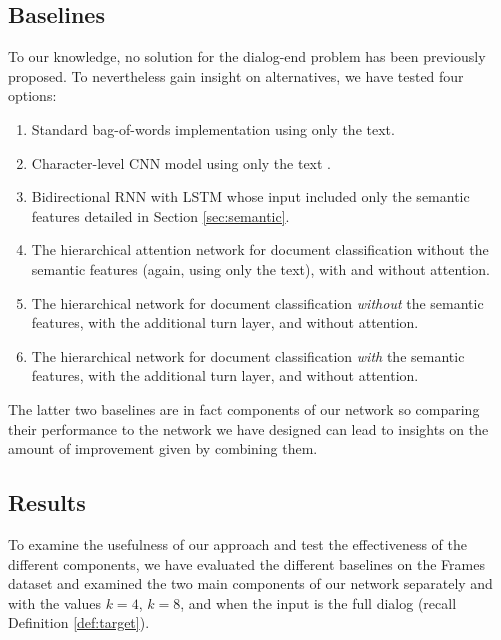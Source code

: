 \subsection{Baselines}
To our knowledge, no solution for the 
dialog-end problem has been previously proposed. To nevertheless
gain insight on alternatives, we have tested four 
options: 
\begin{enumerate}
	\item Standard bag-of-words implementation using only the text.\label{b:1}
	\item Character-level CNN model using only the text \cite{ZhangZL15}.\label{b:2}
	\item Bidirectional RNN with LSTM whose input included only the semantic features detailed in Section \ref{sec:semantic}.\label{b:3}
	\item The hierarchical attention network for document classification \cite{attention} without the semantic features (again, using only the text), with and without attention.\label{b:4}
	\item The hierarchical network for document classification \cite{attention} {\em without} the semantic features, with the additional turn layer, and without attention.\label{b:5}
	\item The hierarchical network for document classification \cite{attention} {\em with} the semantic features, with the additional turn layer, and without attention.\label{b:6}
\end{enumerate}

The latter two baselines are in fact components 
of our network so comparing their performance to 
the network we have designed can lead to insights 
on the amount of improvement given by combining them. 


\subsection{Results}
To examine the usefulness of our approach and 
test the effectiveness of the different components, 
we have evaluated the different baselines on the Frames 
dataset \cite{frames} and examined the two main components of our network separately 
and with the values $k=4$, $k=8$, and when the input is the full dialog (recall Definition \ref{def:target}). 

